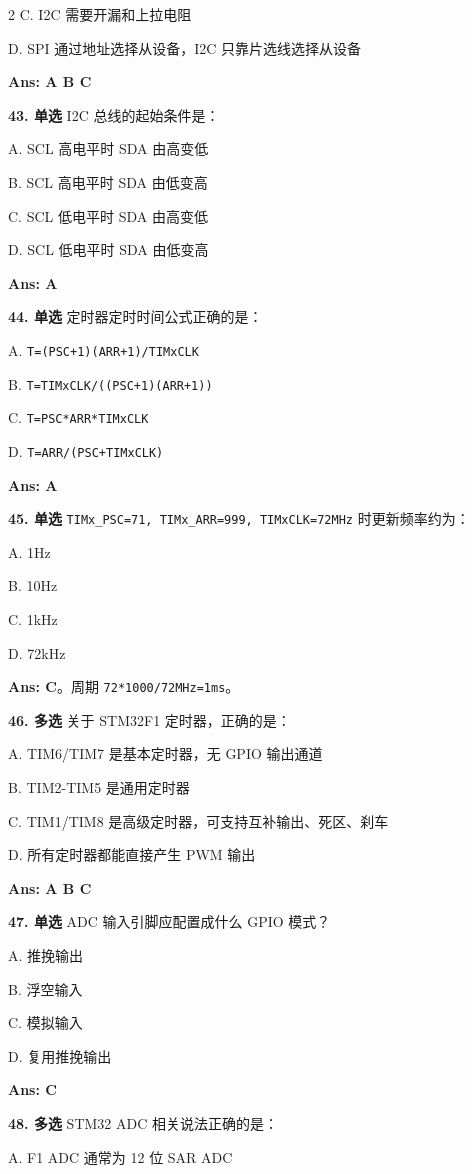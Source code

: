 \documentclass[UTF8,zihao=-5]{ctexart}
\begin{document}
\begin{multicols*}{2}
C. I2C 需要开漏和上拉电阻\par
D. SPI 通过地址选择从设备，I2C 只靠片选线选择从设备\par
\textbf{Ans: A B C}\par
\textbf{43. 单选} I2C 总线的起始条件是：\par
A. SCL 高电平时 SDA 由高变低\par
B. SCL 高电平时 SDA 由低变高\par
C. SCL 低电平时 SDA 由高变低\par
D. SCL 低电平时 SDA 由低变高\par
\textbf{Ans: A}\par
\textbf{44. 单选} 定时器定时时间公式正确的是：\par
A. \texttt{T=(PSC+1)(ARR+1)/TIMxCLK}\par
B. \texttt{T=TIMxCLK/((PSC+1)(ARR+1))}\par
C. \texttt{T=PSC*ARR*TIMxCLK}\par
D. \texttt{T=ARR/(PSC+TIMxCLK)}\par
\textbf{Ans: A}\par
\textbf{45. 单选} \texttt{TIMx\_PSC=71, TIMx\_ARR=999, TIMxCLK=72MHz} 时更新频率约为：\par
A. 1Hz\par
B. 10Hz\par
C. 1kHz\par
D. 72kHz\par
\textbf{Ans: C}。周期 \texttt{72*1000/72MHz=1ms}。\par
\textbf{46. 多选} 关于 STM32F1 定时器，正确的是：\par
A. TIM6/TIM7 是基本定时器，无 GPIO 输出通道\par
B. TIM2-TIM5 是通用定时器\par
C. TIM1/TIM8 是高级定时器，可支持互补输出、死区、刹车\par
D. 所有定时器都能直接产生 PWM 输出\par
\textbf{Ans: A B C}\par
\textbf{47. 单选} ADC 输入引脚应配置成什么 GPIO 模式？\par
A. 推挽输出\par
B. 浮空输入\par
C. 模拟输入\par
D. 复用推挽输出\par
\textbf{Ans: C}\par
\textbf{48. 多选} STM32 ADC 相关说法正确的是：\par
A. F1 ADC 通常为 12 位 SAR ADC\par

\end{multicols*}
\end{document}
